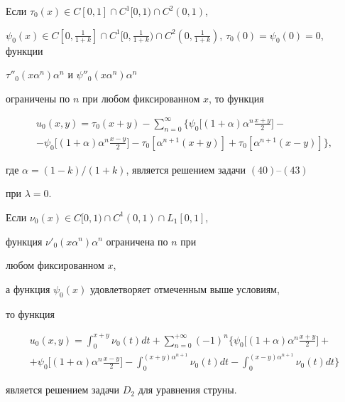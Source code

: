 \begin{lem}


Если $\tau_0(x)\in C[0,1]\cap C^1[0,1)\cap C^2(0,1)$,


$\psi_0(x)\in C[0,\frac {1}{1+k}]\cap C^1[0,\frac {1}{1+k})\cap 


C^2(0,\frac {1}{1+k})$, $\tau_0(0)=\psi_0(0)=0$, функции


$\tau''_0(x\alpha ^n)\alpha ^n$ и $\psi''_0(x\alpha ^n)\alpha ^n$


ограничены по $n$ при любом фиксированном $x$, то функция


\begin{multline}


u_0(x,y)=\tau_0(x+y)-\sum_{n=0}^{\infty}


\bigg\{\psi_0\bigg[(1+\alpha)\alpha ^n\frac {x+y}{2}\bigg]- \\


%


-\psi_0\bigg[(1+\alpha)\alpha ^n\frac {x-y}{2}\bigg]-


\tau_0 [\alpha ^{n+1}(x+y)]+


\tau_0 [\alpha ^{n+1}(x-y)]\bigg\},


\end{multline}


где $\alpha =(1-k)/(1+k)$, является решением задачи $(40)$--$(43)$


при $\lambda =0$. 





Если $\nu_0(x)\in C[0,1)\cap C^1(0,1)\cap L_1[0,1]$,


функция $\nu'_0(x\alpha ^n)\alpha ^n$ ограничена по $n$ при 


любом фиксированном $x$,


а функция $\psi_0(x)$ удовлетворяет отмеченным выше условиям,


то функция


\begin{multline}


u_0(x,y)=\int_0^{x+y}\nu_0(t)dt+\sum_{n=0}^{+\infty}(-1)^n


\bigg\{\psi_0\bigg[(1+\alpha)\alpha ^n\frac {x+y}{2}\bigg]+ \\


%


+\psi_0\bigg[(1+\alpha)\alpha ^n\frac {x-y}{2}\bigg]-


\int_0^{(x+y)\alpha ^{n+1}}\nu_0(t)dt-


\int_0^{(x-y)\alpha ^{n+1}}\nu_0(t)dt\bigg\}


\end{multline}


является решением задачи $D_2$ для уравнения струны. 


\end{lem}





